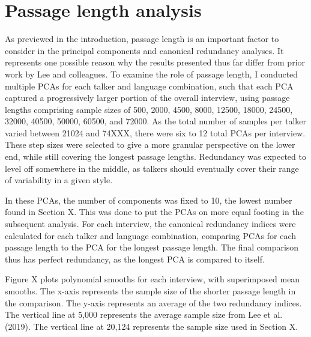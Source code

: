 \section{Passage length analysis}\label{ch3:sec:passagelength}
As previewed in the introduction, passage length is an important factor to consider in the principal components and canonical redundancy analyses. It represents one possible reason why the results presented thus far differ from prior work by Lee and colleagues. To examine the role of passage length, I conducted multiple PCAs for each talker and language combination, such that each PCA captured a progressively larger portion of the overall interview, using passage lengths comprising sample sizes of 500, 2000, 4500, 8000, 12500, 18000, 24500, 32000, 40500, 50000, 60500, and 72000. As the total number of samples per talker varied between 21024 and 74XXX, there were six to 12 total PCAs per interview. These step sizes were selected to give a more granular perspective on the lower end, while still covering the longest passage lengths. Redundancy was expected to level off somewhere in the middle, as talkers should eventually cover their range of variability in a given style.

In these PCAs, the number of components was fixed to 10, the lowest number found in Section X. This was done to put the PCAs on more equal footing in the subsequent analysis. For each interview, the canonical redundancy indices were calculated for each talker and language combination, comparing PCAs for each passage length to the PCA for the longest passage length. The final comparison thus has perfect redundancy, as the longest PCA is compared to itself.

Figure X plots polynomial smooths for each interview, with superimposed mean smooths. The x-axis represents the sample size of the shorter passage length in the comparison. The y-axis represents an average of the two redundancy indices. The vertical line at 5,000 represents the average sample size from Lee et al. (2019). The vertical line at 20,124 represents the sample size used in Section X. 

